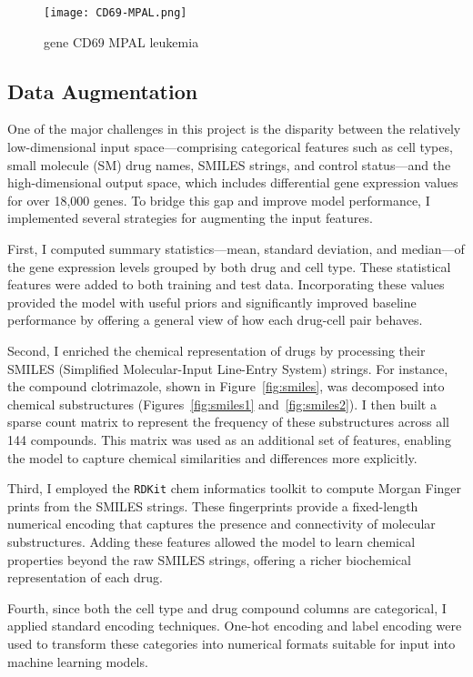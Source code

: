 \documentclass[11pt, oneside]{article}   	%
\begin{document}
\begin{figure}[htbp]
  \centering
  \texttt{[image: CD69-MPAL.png]}
  \caption{gene CD69 MPAL leukemia}
  \label{fig:CD69MPAL}
\end{figure}


\subsection{Data Augmentation}

One of the major challenges in this project is the disparity between the relatively low-dimensional input space—comprising categorical features such as cell types, small molecule (SM) drug names, SMILES strings, and control status—and the high-dimensional output space, which includes differential gene expression values for over 18,000 genes. To bridge this gap and improve model performance, I implemented several strategies for augmenting the input features.

First, I computed summary statistics—mean, standard deviation, and median—of the gene expression levels grouped by both drug and cell type. These statistical features were added to both training and test data. Incorporating these values provided the model with useful priors and significantly improved baseline performance by offering a general view of how each drug-cell pair behaves.

Second, I enriched the chemical representation of drugs by processing their SMILES (Simplified Molecular-Input Line-Entry System) strings. For instance, the compound clotrimazole, shown in Figure~\ref{fig:smiles}, was decomposed into chemical substructures (Figures~\ref{fig:smiles1} and~\ref{fig:smiles2}). I then built a sparse count matrix to represent the frequency of these substructures across all 144 compounds. This matrix was used as an additional set of features, enabling the model to capture chemical similarities and differences more explicitly.

Third, I employed the \texttt{RDKit} chem informatics toolkit to compute Morgan Finger prints from the SMILES strings. These fingerprints provide a fixed-length numerical encoding that captures the presence and connectivity of molecular substructures. Adding these features allowed the model to learn chemical properties beyond the raw SMILES strings, offering a richer biochemical representation of each drug.

Fourth, since both the cell type and drug compound columns are categorical, I applied standard encoding techniques. One-hot encoding and label encoding were used to transform these categories into numerical formats suitable for input into machine learning models.
\end{document}
